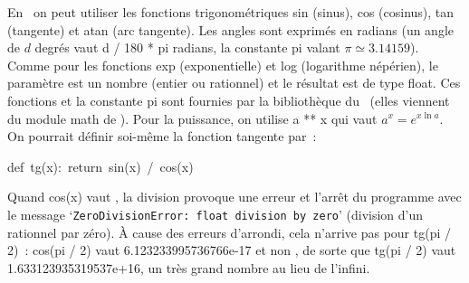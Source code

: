 {\begin{minipage}{\myparboxwidth}
 En \python\ on peut utiliser les fonctions trigonométriques {\idt sin} (sinus),
 {\idt cos} (cosinus), {\idt tan} (tangente) et {\idt atan} (arc tangente). Les angles sont exprimés en
 radians (un angle de $d$ degrés vaut {\idt d / 180 * pi} radians, la constante {\idt pi}
 valant $\pi \simeq 3.14159$). Comme pour les
 fonctions {\idt exp} (exponentielle) et
 {\idt log} (logarithme népérien), le
  paramètre est un nombre (entier ou rationnel) et le
résultat est de type {\idt float}. Ces fonctions et la constante {\idt pi} sont fournies par la
bibliothèque du \robot\ (elles viennent du module {\idt math} de \python). Pour la puissance, on utilise
 {\idt a ** x} qui vaut $a^{x} = e^{x \ln a}$. On pourrait définir soi-même la fonction tangente par~:
 
{
\parindent {}
\medskip
\mbox{\blc  \blk\idt  \mcl def\idt \ tg(x):\ \mcl return\idt \ sin(x)\ /\ cos(x)}\par 
}

\noindent Quand {\idt cos(x)} vaut {}, la division provoque une erreur et
l'arrêt du programme avec le message `{\tt ZeroDivisionError:\ float division by zero}'
(division d'un rationnel par zéro). À cause des erreurs d'arrondi, cela n'arrive pas pour
{\idt tg(pi / 2)}~: {\idt cos(pi / 2)} vaut {\idt 6.123233995736766e-17} et non {}, de sorte
que {\idt tg(pi / 2)} vaut {\idt 1.633123935319537e+16}, un très grand nombre au lieu de l'infini.

\vspace{\abovedisplayskip}
\end{minipage}
}


